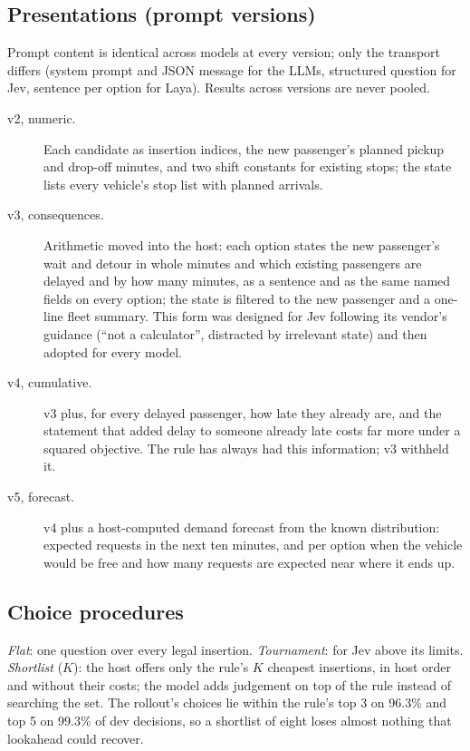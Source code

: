 \documentclass[11pt]{article}
\begin{document}
\subsection{Presentations (prompt versions)}
\label{sec:presentations}
Prompt content is identical across models at every version; only the transport differs (system prompt and JSON message for the LLMs, structured question for Jev, sentence per option for Laya). Results across versions are never pooled.
\begin{description}
\item[v2, numeric.] Each candidate as insertion indices, the new passenger's planned pickup and drop-off minutes, and two shift constants for existing stops; the state lists every vehicle's stop list with planned arrivals.
\item[v3, consequences.] Arithmetic moved into the host: each option states the new passenger's wait and detour in whole minutes and which existing passengers are delayed and by how many minutes, as a sentence and as the same named fields on every option; the state is filtered to the new passenger and a one-line fleet summary. This form was designed for Jev following its vendor's guidance (``not a calculator'', distracted by irrelevant state) and then adopted for every model.
\item[v4, cumulative.] v3 plus, for every delayed passenger, how late they already are, and the statement that added delay to someone already late costs far more under a squared objective. The rule has always had this information; v3 withheld it.
\item[v5, forecast.] v4 plus a host-computed demand forecast from the known distribution: expected requests in the next ten minutes, and per option when the vehicle would be free and how many requests are expected near where it ends up.
\end{description}

\subsection{Choice procedures}
\emph{Flat}: one question over every legal insertion. \emph{Tournament}: for Jev above its limits. \emph{Shortlist} ($K$): the host offers only the rule's $K$ cheapest insertions, in host order and without their costs; the model adds judgement on top of the rule instead of searching the set. The rollout's choices lie within the rule's top 3 on 96.3\% and top 5 on 99.3\% of dev decisions, so a shortlist of eight loses almost nothing that lookahead could recover.
\end{document}

